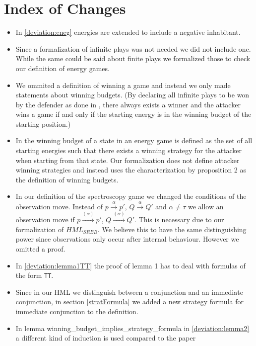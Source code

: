\section{Index of Changes}
\begin{itemize}
    \item In \ref{deviation:eneg} energies are extended to include a negative inhabitant. 
    \item Since a formalization of infinite plays was not needed we did not include one. While the 
same could be said about finite plays we formalized those to check our definition of energy games.
    \item We ommited a definition of winning a game and instead we only made statements about winning budgets. 
(By declaring all infinite plays to be won by the defender as done in \cite{bisping2023lineartimebranchingtime}, 
there always exists a winner and the attacker wins a game if and only if the starting energy is in the winning budget of the starting position.)
    \item In \cite{bisping2023lineartimebranchingtime} the winning budget of a state in an energy game 
is defined as the set of all starting energies such that there exists a winning strategy for the attacker 
when starting from that state. Our formalization does not define attacker winning strategies and instead 
uses the characterization by proposition 2 \cite[p. 9]{bisping2023lineartimebranchingtime} as the definition of winning budgets.
    \item In our definition of the spectroscopy game we changed the conditions of the observation move. 
Instead of $p \overset{\alpha}{\longrightarrow}p'$, $Q \overset{\alpha}{\longrightarrow} Q'$ and $\alpha \neq \tau$
we allow an observation move if  $p \overset{(\alpha)}{\longrightarrow}p'$, $Q \overset{(\alpha)}{\longrightarrow} Q'$.
This is necessary due to our formalization of $HML_{SRBB}$. We believe this to have the same distinguishing power 
since observations only occur after internal behaviour. However we omitted a proof. 
    \item In \ref{deviation:lemma1TT} the proof of lemma 1 has to deal with formulas of the form \texttt{TT}. 
    \item Since in our HML we distinguish between a conjunction and an immediate conjunction, in section \ref{stratFormula} 
    we added a new strategy formula for immediate conjunction to the definition.
    \item In lemma winning\_budget\_implies\_strategy\_formula in \ref{deviation:lemma2} a different kind of induction is used compared to the paper 

\end{itemize}

